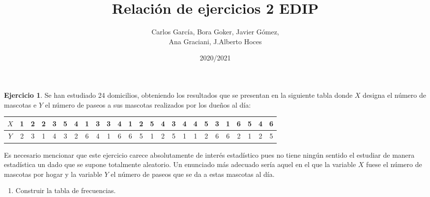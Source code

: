 \documentclass[a4paper, 12pt]{article}
\title{\textbf{Relación de ejercicios 2 EDIP}}
\author{Carlos García, Bora Goker, Javier Gómez,  \\ Ana Graciani, J.Alberto Hoces}
\date{2020/2021}
\theoremstyle{definition}
\newtheorem{ej}{Ejercicio}
\begin{document}
\maketitle

\begin{ej}
Se han estudiado 24 domicilios, obteniendo los resultados que se presentan en la siguiente tabla donde \(X\) designa el número de mascotas e \(Y\) el número de paseos a sus mascotas realizados por los dueños al día:

\begin{center}
\begin{tabular}{|c|c|c|c|c|c|c|c|c|c|c|c|c|c|c|c|c|c|c|c|c|c|c|c|c|}
\(X\) & 1 & 2 & 2 & 3 & 5 & 4 & 1 & 3 & 3 & 4 & 1 & 2 & 5 & 4 & 3 & 4 & 4 & 5 & 3 & 1 & 6 & 5 & 4 & 6 \\
\hline
\(Y\) & 2 & 3 & 1 & 4 & 3 & 2 & 6 & 4 & 1 & 6 & 6 & 5 & 1 & 2 & 5 & 1 & 1 & 2 & 6 & 6 & 2 & 1 & 2 & 5
\end{tabular}
\end{center}

Es necesario mencionar que este ejercicio carece absolutamente de interés estadístico pues no tiene ningún sentido el estudiar de manera estadística un dado que se supone totalmente aleatorio. Un enunciado más adecuado sería aquel en el que la variable \(X\) fuese el número de mascotas por hogar y la variable \(Y\) el número de paseos que se da a estas mascotas al día.

\begin{center}
\end{center}

\begin{enumerate}[label=\alph*)]
	\item Construir la tabla de frecuencias.
	

\end{enumerate}
\end{ej}
\end{document}
